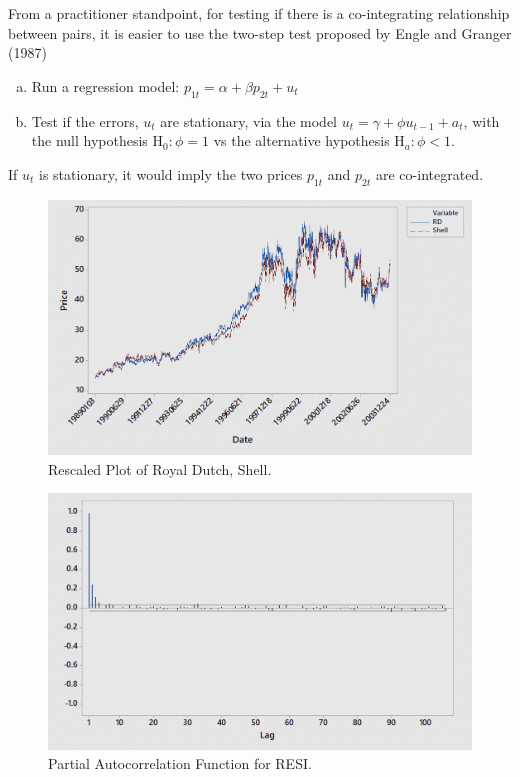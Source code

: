 From a practitioner standpoint, for testing if there is a co-integrating relationship between pairs, it is easier to use the two-step test proposed by Engle and Granger (1987)~\cite{engle1987co}
\begin{enumerate}[a)]
\item Run a regression model: $p_{1t}=\alpha+\beta p_{2t} + u_t$

\item Test if the errors, $u_t$ are stationary, via the model $u_t=\gamma+\phi u_{t-1}+a_t$, with the null hypothesis $\text{H}_0: \phi=1$ vs  the alternative hypothesis $\text{H}_a: \phi<1$.
\end{enumerate}
If $u_t$ is stationary, it would imply the two prices $p_{1t}$ and $p_{2t}$ are co-integrated. 

	\begin{figure}[!ht]
	\centering
	\includegraphics[width=\textwidth]{chapters/chapter_stat_ts/figures/rds.png}
	\caption{Rescaled Plot of Royal Dutch, Shell. \label{fig:rds}}
	\end{figure}
	
	\begin{figure}[!ht]
	\centering
	\includegraphics[width=\textwidth]{chapters/chapter_stat_ts/figures/pafresi.png}
	\caption{Partial Autocorrelation Function for RESI. \label{fig:pafresi}}
	\end{figure}
	
